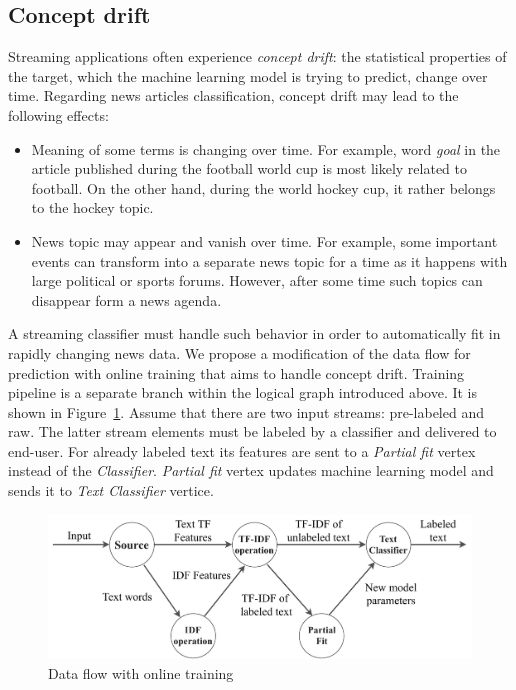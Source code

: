 \subsection{Concept drift}

Streaming applications often experience {\em concept drift}: the statistical properties of the target, which the machine learning model is trying to predict, change over time. Regarding news articles classification, concept drift may lead to the following effects:

\begin{itemize}
    \item Meaning of some terms is changing over time. For example, word {\em goal} in the article published during the football world cup is most likely related to football. On the other hand, during the world hockey cup, it rather belongs to the hockey topic.
    \item News topic may appear and vanish over time. For example, some important events can transform into a separate news topic for a time as it happens with large political or sports forums. However, after some time such topics can disappear form a news agenda.
\end{itemize}

A streaming classifier must handle such behavior in order to automatically fit in rapidly changing news data. We propose a modification of the data flow for prediction with online training that aims to handle concept drift. Training pipeline is a separate branch within the logical graph introduced above. It is shown in Figure~\ref{training_graph}. Assume that there are two input streams: pre-labeled and raw. The latter stream elements must be labeled by a classifier and delivered to end-user. For already labeled text its features are sent to a {\em Partial fit} vertex instead of the {\em Classifier}. {\em Partial fit} vertex updates machine learning model and sends it to {\em Text Classifier} vertice.

\begin{figure}[htbp]
  \centering
  \includegraphics[scale=0.44]{pics/logical-graph}
  \caption{Data flow with online training}
  \label {training_graph}
\end{figure}

